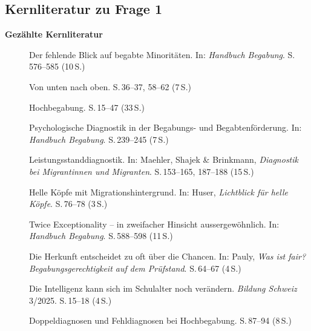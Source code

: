 \documentclass[ngerman, a4paper]{article}
\begin{document}
\subsection{Kernliteratur zu Frage 1}

\textbf{Gezählte Kernliteratur}

\begin{description}
  \item[\cite{stamm2021fehlenderblick}] Der fehlende Blick auf begabte Minoritäten.
        In: \textit{Handbuch Begabung}.
        S.\,576--585 (10\,S.)

  \item[\cite{stamm2025vonuntennachoben}] Von unten nach oben.
        S.\,36--37, 58--62 (7\,S.)

  \item[\cite{preckel2013hochbegabung}] Hochbegabung.
        S.\,15--47 (33\,S.)

  \item[\cite{gauckreimann2021psychdiagnostik}] Psychologische Diagnostik in der Begabungs- und Begabtenförderung.
        In: \textit{Handbuch Begabung}.
        S.\,239--245 (7\,S.)

  \item[\cite{haag2018leistungsstanddiagnostik}] Leistungsstanddiagnostik.
        In: Maehler, Shajek \& Brinkmann, \textit{Diagnostik bei Migrantinnen und Migranten}.
        S.\,153--165, 187--188 (15\,S.)

  \item[\cite{kellerkoller2025hellekoepfe}] Helle Köpfe mit Migrationshintergrund.
        In: Huser, \textit{Lichtblick für helle Köpfe}.
        S.\,76--78 (3\,S.)

  \item[\cite{baumschader2021twice}] Twice Exceptionality -- in zweifacher Hinsicht aussergewöhnlich.
        In: \textit{Handbuch Begabung}.
        S.\,588--598 (11\,S.)

  \item[\cite{koop2025herkunft}] Die Herkunft entscheidet zu oft über die Chancen.
        In: Pauly, \textit{Was ist fair? Begabungsgerechtigkeit auf dem Prüfstand}.
        S.\,64--67 (4\,S.)

  \item[\cite{stern2025intelligenz}] Die Intelligenz kann sich im Schulalter noch verändern.
        \textit{Bildung Schweiz} 3/2025.
        S.\,15--18 (4\,S.)

  \item[\cite{webb2020doppeldiagnosen}] Doppeldiagnosen und Fehldiagnosen bei Hochbegabung.
        S.\,87--94 (8\,S.)


\end{description}
\end{document}
